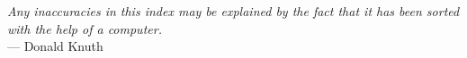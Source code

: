 \tableofcontents

\vfill

\textit{\glqq{}Any inaccuracies in this index may be explained by the fact that it has been sorted with the help of a computer.\grqq{}}\\
\mbox{}\hfill --- Donald Knuth
